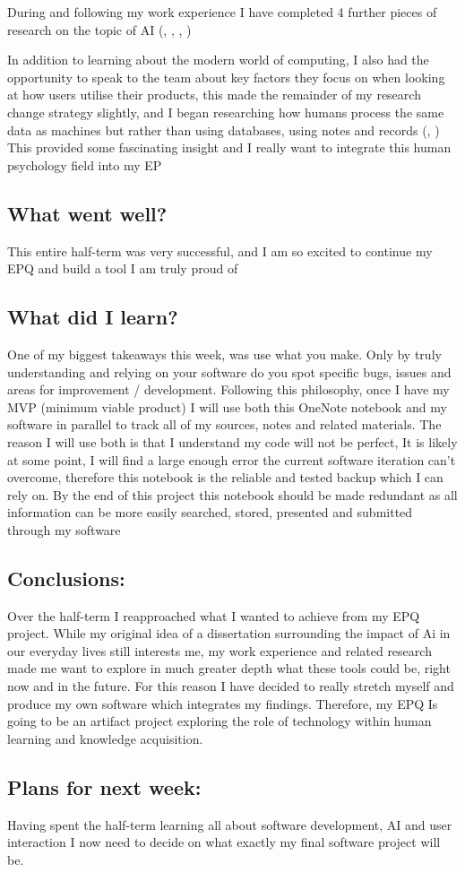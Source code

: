 During and following my work experience I have completed 4 further pieces of research on the topic of AI (, , , )

In addition to learning about the modern world of computing, I also had the opportunity to speak to the team about key factors they focus on when looking at how users utilise their products, this made the remainder of my research change strategy slightly, and I began researching how humans process the same data as machines but rather than using databases, using notes and records (, ) This provided some fascinating insight and I really want to integrate this human psychology field into my EP

\subsection*{What went well?}
This entire half-term was very successful, and I am so excited to continue my EPQ and build a tool I am truly proud of
\subsection*{What did I learn?}
One of my biggest takeaways this week, was use what you make. Only by truly understanding and relying on your software do you spot specific bugs, issues and areas for improvement / development. Following this philosophy, once I have my MVP (minimum viable product) I will use both this OneNote notebook and my software in parallel to track all of my sources, notes and related materials. The reason I will use both is that I understand my code will not be perfect, It is likely at some point, I will find a large enough error the current software iteration can't overcome, therefore this notebook is the reliable and tested backup which I can rely on. By the end of this project this notebook should be made redundant as all information can be more easily searched, stored, presented and submitted through my software
\subsection*{Conclusions:}
Over the half-term I reapproached what I wanted to achieve from my EPQ project. While my original idea of a dissertation surrounding the impact of Ai in our everyday lives still interests me, my work experience and related research made me want to explore in much greater depth what these tools could be, right now and in the future. For this reason I have decided to really stretch myself and produce my own software which integrates my findings. Therefore, my EPQ Is going to be an artifact project exploring the role of technology within human learning and knowledge acquisition.

\subsection*{Plans for next week:}
Having spent the half-term learning all about software development, AI and user interaction I now need to decide on what exactly my final software project will be.
